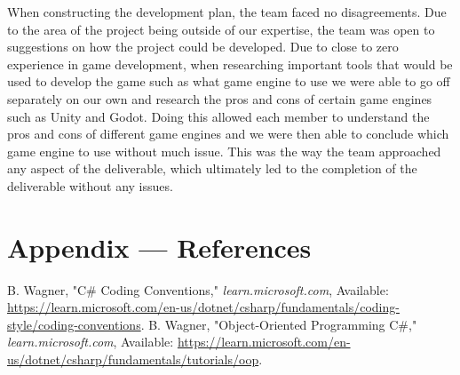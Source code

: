 \documentclass{article}
\begin{document}
\begin{enumerate}
    When constructing the development plan, the team faced no disagreements. Due to the area of the project being outside of our expertise, the team was open to suggestions on how the project could be developed. Due to close to zero experience in game development, when researching important tools that would be used to develop the game such as what game engine to use we were able to go off separately on our own and research the pros and cons of certain game engines such as Unity and Godot. Doing this allowed each member to understand the pros and cons of different game engines and we were then able to conclude which game engine to use without much issue. This was the way the team approached any aspect of the deliverable, which ultimately led to the completion of the deliverable without any issues.\end{enumerate}

\newpage{}

\section*{Appendix --- References}

\begin{flushleft}
  [1] B. Wagner, "C\# Coding Conventions," \textit{learn.microsoft.com}, Available: \url{https://learn.microsoft.com/en-us/dotnet/csharp/fundamentals/coding-style/coding-conventions}.
  \newline
  [2] B. Wagner, "Object-Oriented Programming C\#," \textit{learn.microsoft.com}, Available: \url{https://learn.microsoft.com/en-us/dotnet/csharp/fundamentals/tutorials/oop}.
\end{flushleft}
\end{document}
